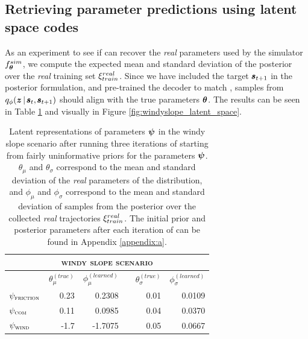 \subsection{Retrieving parameter predictions using latent space codes}

As an experiment to see if \dettostoc{} can recover the \emph{real} parameters used by the simulator $f^{sim}_{\boldsymbol{\theta}}$, we compute the expected mean and standard deviation of the posterior over the \emph{real} training set $\xi^{real}_{train}$. Since we have included the target $\pmb{s}_{t+1}$ in the posterior formulation, and pre-trained the decoder to match \fsimulator{}, samples from $\qphi \given{\vz}{\vs, \vns}$ should align with the true parameters $\boldsymbol{\theta}$. The results can be seen in Table \ref{fig_3_parameters_table} and visually in Figure \ref{fig:windyslope_latent_space}.

\begin{table}[h!]
\centering
\begin{tabular}{lrrcrr}
\multicolumn{6}{c}{\textsc{windy slope scenario}} \\
\toprule
& $\theta_\mu^{(true)}$ & $\phi_\mu^{(learned)}$ && $\theta_\sigma^{(true)}$ & $\phi_\sigma^{(learned)}$ \\
\midrule

$\psi_{\textsc{friction}}$ & 0.23 & 0.2308 && 0.01 & 0.0109 \\
$\psi_{\textsc{com}}$ & 0.11 & 0.0985 && 0.04 & 0.0370 \\
$\psi_{\textsc{wind}}$ & -1.7 & -1.7075 && 0.05 & 0.0667 \\
\bottomrule
\end{tabular}
\caption{Latent representations of parameters $\boldsymbol{\psi}$ in the windy slope scenario after running three iterations of \dettostoc{} starting from fairly uninformative priors for the parameters $\boldsymbol{\psi}$. $\theta_\mu$ and $\theta_\sigma$ correspond to the mean and standard deviation of the \emph{real} parameters of the distribution, and $\phi_\mu$ and $\phi_\sigma$ correspond to the mean and standard deviation of samples from the posterior over the collected \emph{real} trajectories $\xi^{real}_{train}$. The initial prior and posterior parameters after each iteration of \dettostoc{} can be found in Appendix \ref{appendix:a}.}
\label{fig_3_parameters_table}
\end{table}

